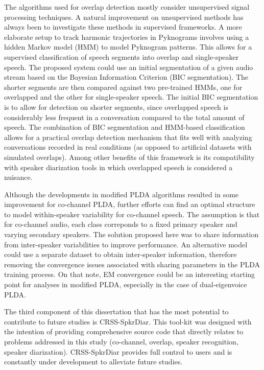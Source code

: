 The algorithms used for overlap detection mostly consider unsupervised signal processing techniques. 
A natural improvement on unsupervised methods has always been to investigate these methods in supervised frameworks. 
A more elaborate setup to track harmonic trajectories in Pyknograms involves using a hidden Markov model (HMM) to model Pyknogram patterns. 
This allows for a supervised classification of speech segments into overlap and single-speaker speech. 
The proposed system could use an initial segmentation of a given audio stream based on the Bayesian Information Criterion (BIC segmentation). 
The shorter segments are then compared against two pre-trained HMMs, one for overlapped and the other for single-speaker speech. 
The initial BIC segmentation is to allow for detection on shorter segments, since overlapped speech is considerably less frequent in a conversation compared to the total amount of speech. 
The combination of BIC segmentation and HMM-based classification allows for a practical overlap detection mechanism that fits well with analyzing conversations recorded in real conditions (as opposed to artificial datasets with simulated overlaps). 
Among other benefits of this framework is its compatibility with speaker diarization tools in which overlapped speech is considered a nuisance. 

Although the developments in modified PLDA algorithms resulted in some improvement for co-channel PLDA, further efforts can find an optimal structure to model within-speaker variability for co-channel speech. 
The assumption is that for co-channel audio, each class correponds to a fixed primary speaker and varying secondary speakers. 
The solution proposed here was to share information from inter-speaker variabilities to improve performance. 
An alternative model could use a separate dataset to obtain inter-speaker information, therefore removing the convergence issues associated with sharing parameters in the PLDA training process. 
On that note, EM convergence could be an interesting starting point for analyses in modified PLDA, especially in the case of dual-eigenvoice PLDA. 

The third component of this dissertation that has the most potential to contribute to future studies is CRSS-SpkrDiar. 
This tool-kit was designed with the intention of providing comprehensive source code that directly relates to problems addressed in this study (co-channel, overlap, speaker recognition, speaker diarization). 
CRSS-SpkrDiar provides full control to users and is constantly under development to alleviate future studies. 






